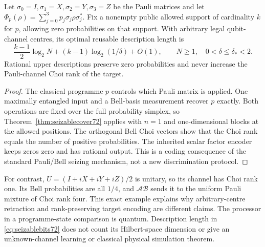 \begin{corollary}\label{cor:paulicoding72}
Let $\sigma_0=I,\sigma_1=X,\sigma_2=Y,\sigma_3=Z$ be the Pauli
matrices and let
$\Phi_p(\rho)=\sum_{j=0}^3p_j\sigma_j\rho\sigma_j^*$.
Fix a nonempty public allowed support of cardinality $k$ for $p$,
allowing zero probabilities on that support. With arbitrary legal
qubit-channel centres, its optimal reusable description length is
\[
 \frac{k-1}{2}\log_2N+(k-1)\log_2(1/\delta)+O(1),
 \qquad N\ge1,\quad 0<\delta\le\delta_*<2.
\]
Rational upper descriptions preserve zero probabilities and never
increase the Pauli-channel Choi rank of the target.
\end{corollary}
\begin{proof}
The classical programme $p$ controls which Pauli matrix is applied.
One maximally entangled input and a Bell-basis measurement recover
$p$ exactly. Both operations are fixed over the full probability
simplex, so Theorem~\ref{thm:seizablecover72} applies with $n=1$
and one-dimensional blocks at the allowed positions. The orthogonal
Bell Choi vectors show that the Choi rank equals the number of
positive probabilities. The inherited scalar factor encoder keeps
zeros zero and has rational output. This is a coding consequence of
the standard Pauli/Bell seizing mechanism, not a new discrimination
protocol.
\end{proof}
For contrast, $U=(I+iX+iY+iZ)/2$ is unitary, so its channel has
Choi rank one. Its Bell probabilities are all $1/4$, and
$\mathcal A\mathcal B$ sends it to the uniform Pauli mixture of Choi
rank four. This exact example explains why arbitrary-centre
retraction and rank-preserving target encoding are different claims.
The processor in a programme-state comparison is quantum. Description
length in \eqref{eq:seizablebits72} does not count its Hilbert-space
dimension or give an unknown-channel learning or classical physical
simulation theorem.

